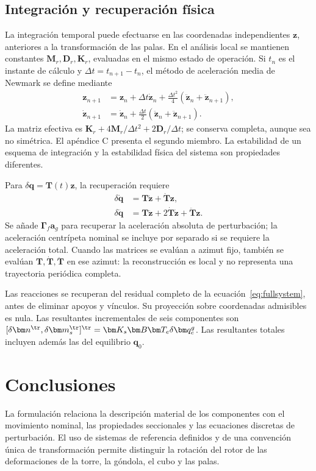 \subsection{Integración y recuperación física}
La integración temporal puede efectuarse en las coordenadas independientes $\bm z$, anteriores a la transformación de las palas. En el análisis local se mantienen constantes $\bm M_r,\bm D_r,\bm K_r$, evaluadas en el mismo estado de operación. Si $t_n$ es el instante de cálculo y $\Delta t=t_{n+1}-t_n$, el método de aceleración media de Newmark se define mediante
\begin{align}
\bm z_{n+1}&=\bm z_n+\Delta t\dot{\bm z}_n
+\tfrac{\Delta t^2}{4}(\ddot{\bm z}_n+\ddot{\bm z}_{n+1}),\nonumber\\
\dot{\bm z}_{n+1}&=\dot{\bm z}_n+\tfrac{\Delta t}{2}
(\ddot{\bm z}_n+\ddot{\bm z}_{n+1}).
\end{align}
La matriz efectiva es $\bm K_r+4\bm M_r/\Delta t^2+2\bm D_r/\Delta t$; se conserva completa, aunque sea no simétrica. El apéndice C presenta el segundo miembro. La estabilidad de un esquema de integración y la estabilidad física del sistema son propiedades diferentes.

Para $\delta\bm q=\bm T(t)\bm z$, la recuperación requiere
\begin{align}
\delta\dot{\bm q}&=\bm T\dot{\bm z}+\dot{\bm T}\bm z,\nonumber\\
\delta\ddot{\bm q}&=\bm T\ddot{\bm z}+2\dot{\bm T}\dot{\bm z}+\ddot{\bm T}\bm z.
\end{align}
Se añade $\bm\Gamma_f\bm a_g$ para recuperar la aceleración absoluta de perturbación; la aceleración centrípeta nominal se incluye por separado si se requiere la aceleración total. Cuando las matrices se evalúan a azimut fijo, también se evalúan $\bm T,\dot{\bm T},\ddot{\bm T}$ en ese azimut: la reconstrucción es local y no representa una trayectoria periódica completa.

Las reacciones se recuperan del residual completo de la ecuación~\eqref{eq:fullsystem}, antes de eliminar apoyos y vínculos. Su proyección sobre coordenadas admisibles es nula. Las resultantes incrementales de seis componentes son
$[\delta\bm n^\tr,\delta\bm m_s^\tr]^\tr=\bm K_s\bm B\bm T_e\delta\bm q_e^g$.
Las resultantes totales incluyen además las del equilibrio $\bm q_0$.

\section{Conclusiones}
La formulación relaciona la descripción material de los componentes con el movimiento nominal, las propiedades seccionales y las ecuaciones discretas de perturbación. El uso de sistemas de referencia definidos y de una convención única de transformación permite distinguir la rotación del rotor de las deformaciones de la torre, la góndola, el cubo y las palas.

